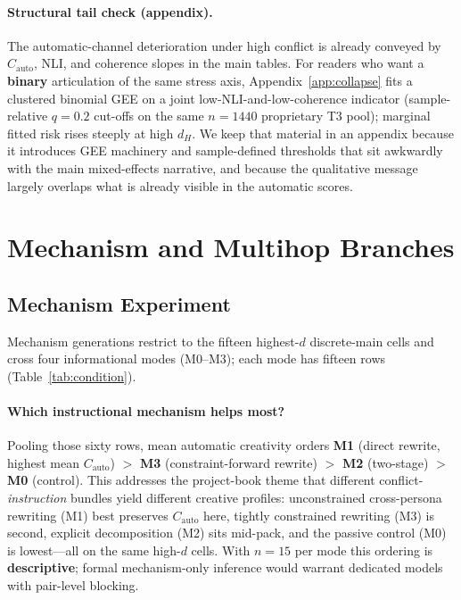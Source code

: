 \documentclass[sigconf,nonacm]{acmart}
\begin{document}
\paragraph{Structural tail check (appendix).}
The automatic-channel deterioration under high conflict is already conveyed by $C_{\mathrm{auto}}$, NLI, and coherence slopes in the main tables.
For readers who want a \textbf{binary} articulation of the same stress axis, Appendix~\ref{app:collapse} fits a clustered binomial GEE on a joint low-NLI-and-low-coherence indicator (sample-relative $q{=}0.2$ cut-offs on the same $n{=}1440$ proprietary T3 pool); marginal fitted risk rises steeply at high $d_H$.
We keep that material in an appendix because it introduces GEE machinery and sample-defined thresholds that sit awkwardly with the main mixed-effects narrative, and because the qualitative message largely overlaps what is already visible in the automatic scores.

\section{Mechanism and Multihop Branches}

\subsection{Mechanism Experiment}

Mechanism generations restrict to the fifteen highest-$d$ discrete-main cells and cross four informational modes (M0--M3); each mode has fifteen rows (Table~\ref{tab:condition}).

\paragraph{Which instructional mechanism helps most?}
Pooling those sixty rows, mean automatic creativity orders \textbf{M1} (direct rewrite, highest mean $C_{\mathrm{auto}}$) ${>}$ \textbf{M3} (constraint-forward rewrite) ${>}$ \textbf{M2} (two-stage) ${>}$ \textbf{M0} (control). This addresses the project-book theme that different conflict-\emph{instruction} bundles yield different creative profiles: unconstrained cross-persona rewriting (M1) best preserves $C_{\mathrm{auto}}$ here, tightly constrained rewriting (M3) is second, explicit decomposition (M2) sits mid-pack, and the passive control (M0) is lowest---all on the same high-$d$ cells.
With $n{=}15$ per mode this ordering is \textbf{descriptive}; formal mechanism-only inference would warrant dedicated models with pair-level blocking.
\end{document}
